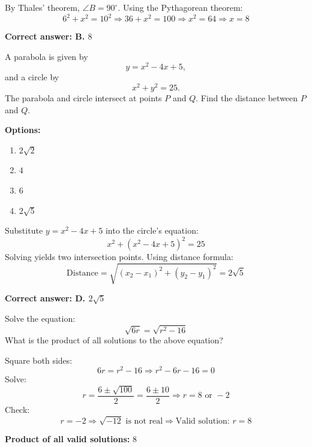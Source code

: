 \documentclass[12pt]{article}
\begin{document}
\begin{tcolorbox}[colback=green!10, colframe=green!50!black, title=Answer]
By Thales' theorem, $\angle B = 90^\circ$. Using the Pythagorean theorem:
\[
6^2 + x^2 = 10^2 \Rightarrow 36 + x^2 = 100 \Rightarrow x^2 = 64 \Rightarrow x = 8
\]

\textbf{Correct answer: B. $8$}
\end{tcolorbox}

\begin{tcolorbox}[colback=blue!5!white, colframe=blue!75!black, title=Question]
A parabola is given by 
\[
y = x^2 - 4x + 5,
\]
and a circle by 
\[
x^2 + y^2 = 25.
\]
The parabola and circle intersect at points $P$ and $Q$. Find the distance between $P$ and $Q$.

\textbf{Options:}
\begin{enumerate}
    \item[A.] $2\sqrt{2}$
    \item[B.] $4$
    \item[C.] $6$
    \item[D.] $2\sqrt{5}$
\end{enumerate}
\end{tcolorbox}

\begin{tcolorbox}[colback=green!10, colframe=green!50!black, title=Answer]
Substitute $y = x^2 - 4x + 5$ into the circle's equation:
\[
x^2 + (x^2 - 4x + 5)^2 = 25
\]
Solving yields two intersection points. Using distance formula:
\[
\text{Distance} = \sqrt{(x_2 - x_1)^2 + (y_2 - y_1)^2} = 2\sqrt{5}
\]

\textbf{Correct answer: D. $2\sqrt{5}$}
\end{tcolorbox}

\begin{tcolorbox}[colback=blue!5!white, colframe=blue!75!black, title=Question]
Solve the equation:
\[
\sqrt{6r} = \sqrt{r^2 - 16}
\]
What is the product of all solutions to the above equation?
\end{tcolorbox}

\begin{tcolorbox}[colback=green!10, colframe=green!50!black, title=Answer]
Square both sides:
\[
6r = r^2 - 16 \Rightarrow r^2 - 6r - 16 = 0
\]
Solve:
\[
r = \frac{6 \pm \sqrt{100}}{2} = \frac{6 \pm 10}{2} \Rightarrow r = 8 \text{ or } -2
\]
Check:
\[
r = -2 \Rightarrow \sqrt{-12} \text{ is not real}
\Rightarrow \text{Valid solution: } r = 8
\]

\textbf{Product of all valid solutions: } $\boxed{8}$
\end{tcolorbox}
\end{document}
